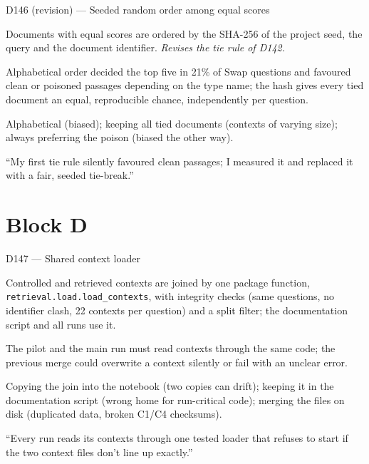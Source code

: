 \documentclass[11pt,a4paper]{report}
\begin{document}
\begin{decisionbox}{D146 (revision) --- Seeded random order among equal scores}
\begin{description}[nosep, leftmargin=0pt]
  \item[Decision.] Documents with equal scores are ordered by the SHA-256 of the project seed, the query and the document identifier. \emph{Revises the tie rule of D142.}
  \item[Why.] Alphabetical order decided the top five in 21\% of Swap questions and favoured clean or poisoned passages depending on the type name; the hash gives every tied document an equal, reproducible chance, independently per question.
  \item[Alternatives.] Alphabetical (biased); keeping all tied documents (contexts of varying size); always preferring the poison (biased the other way).
  \item[Interview line.] ``My first tie rule silently favoured clean passages; I measured it and replaced it with a fair, seeded tie-break.''
\end{description}
\end{decisionbox}


\section{Block D}\label{sec:decisions-d}

\begin{decisionbox}{D147 --- Shared context loader}
\begin{description}[nosep, leftmargin=0pt]
  \item[Decision.] Controlled and retrieved contexts are joined by one package function, \texttt{retrieval.load.load\_contexts}, with integrity checks (same questions, no identifier clash, 22 contexts per question) and a split filter; the documentation script and all runs use it.
  \item[Why.] The pilot and the main run must read contexts through the same code; the previous merge could overwrite a context silently or fail with an unclear error.
  \item[Alternatives.] Copying the join into the notebook (two copies can drift); keeping it in the documentation script (wrong home for run-critical code); merging the files on disk (duplicated data, broken C1/C4 checksums).
  \item[Interview line.] ``Every run reads its contexts through one tested loader that refuses to start if the two context files don't line up exactly.''
\end{description}
\end{decisionbox}
\end{document}
